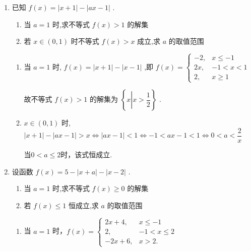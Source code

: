 \begin{enumerate}
    \item 已知 $f\left( x\right)  = \left| {x + 1}\right|  - \left| {{ax} - 1}\right|$ .
    \begin{enumerate}
        \item 当 $a = 1$ 时,求不等式 $f\left( x\right)  > 1$ 的解集
        \item 若 $x \in  \left( {0,1}\right)$ 时不等式 $f\left( x\right)  > x$ 成立,求 $a$ 的取值范围
    \end{enumerate}
    \begin{jieda}
        \begin{enumerate}
            \item 当 $a = 1$ 时, $f\left( x\right)  = \left| {x + 1}\right|  - \left| {x - 1}\right|$ ,即 $f\left( x\right)  = \left\{  \begin{array}{ll}  
            - 2, & x \leq   - 1 \\  
            {2x}, & - 1 < x < 1 \\
            2, & x \geq  1 
            \end{array}\right.$ 
                
            故不等式 $f\left( x\right)  > 1$ 的解集为 $\left\{  {x \left |  x > \dfrac{1}{2}\right.}\right\}$ .
            \item  $x \in  \left( {0,1}\right)$ 时, $\left| {x + 1}\right|  - \left| {{ax} - 1}\right|  > x \Longleftrightarrow \left| {{ax} - 1}\right|  < 1 \Longleftrightarrow -1 < ax-1 < 1 \Longleftrightarrow 0 < a  < \dfrac{2}{x}$

            当$0 < a \leq  2$时，该式恒成立.
            
        \end{enumerate}
    \end{jieda}
    \item 设函数 $f\left( x\right)  = 5 - \left| {x + a}\right|  - \left| {x - 2}\right|$ .
    \begin{enumerate}
        \item 当 $a = 1$ 时,求不等式 $f\left( x\right)  \geq  0$ 的解集
        \item 若 $f\left( x\right)  \leq  1$ 恒成立,求 $a$ 的取值范围
    \end{enumerate}
    \begin{jieda}
        \begin{enumerate}
            \item 当 $a = 1$ 时，$f\left( x\right)  = \left\{  \begin{array}{ll} 
            {2x} + 4, & x \leq   - 1 \\
            2, & - 1 < x \leq  2 \\
            - {2x} + 6, &x > 2. \end{array}\right.$
            

\end{enumerate}
\end{jieda}
\end{enumerate}
